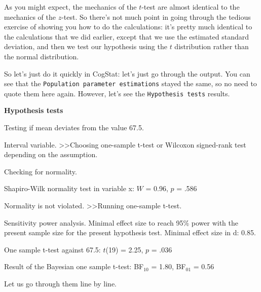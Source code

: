 \documentclass[
]{book}
\theoremstyle{definition}
\theoremstyle{definition}
\theoremstyle{definition}
\theoremstyle{definition}
\theoremstyle{remark}
\begin{document}
As you might expect, the mechanics of the \(t\)-test are almost identical to the mechanics of the \(z\)-test. So there's not much point in going through the tedious exercise of showing you how to do the calculations: it's pretty much identical to the calculations that we did earlier, except that we use the estimated standard deviation, and then we test our hypothesis using the \(t\) distribution rather than the normal distribution.

So let's just do it quickly in CogStat: let's just go through the output. You can see that the \texttt{Population\ parameter\ estimations} stayed the same, so no need to quote them here again. However, let's see the \texttt{Hypothesis\ tests} results.

\begin{tcolorbox}[colback=white,
  colframe=lightgray,
  coltext=black,
  boxsep=4pt,
  boxrule=0.3pt,
  arc=0pt]
  {   \sffamily
      \color{CSblue}\textbf{Hypothesis tests}
      
      \color{CSgreen}Testing if mean deviates from the value 67.5.
      
      Interval variable. \textgreater\textgreater  Choosing one-sample t-test or Wilcoxon signed-rank test depending on the assumption.

      Checking for normality.

      \color{black}
      Shapiro-Wilk normality test in variable x: $W$ = 0.96, $p$ = .586

      \color{CSgreen}
      Normality is not violated. \textgreater\textgreater Running one-sample t-test.

      \color{black}
      Sensitivity power analysis. Minimal effect size to reach 95\% power with the present sample size for the present hypothesis test. Minimal effect size in d: 0.85.
      
      One sample t-test against 67.5: $t$(19) = 2.25, $p$ = .036

      Result of the Bayesian one sample t-test: BF$_{10}$ = 1.80, BF$_{01}$ = 0.56
      \normalfont
  }
\end{tcolorbox}

Let us go through them line by line.
\end{document}

